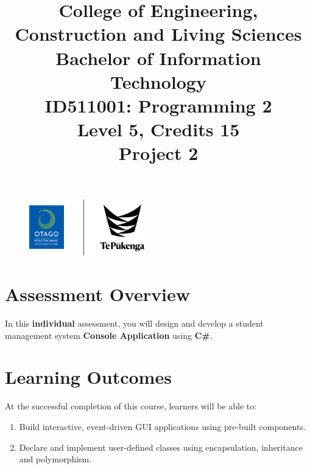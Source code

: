 \documentclass{article}
\author{}
\begin{document}
\begin{figure}
    \centering
    \includegraphics[width=50mm]{../../resources/img/logo.png}
\end{figure}

\title{College of Engineering, Construction and Living Sciences\\Bachelor of Information Technology\\ID511001: Programming 2\\Level 5, Credits 15\\\textbf{Project 2}}
\date{}
\maketitle

\section*{Assessment Overview}
In this \textbf{individual} assessment, you will design and develop a student management system \textbf{Console Application} using \textbf{C\#}. 

\section*{Learning Outcomes}
At the successful completion of this course, learners will be able to:
\begin{enumerate}
    \item Build interactive, event-driven GUI applications using pre-built components.
    \item Declare and implement user-defined classes using encapsulation, inheritance and polymorphism.
\end{enumerate}
\end{document}
